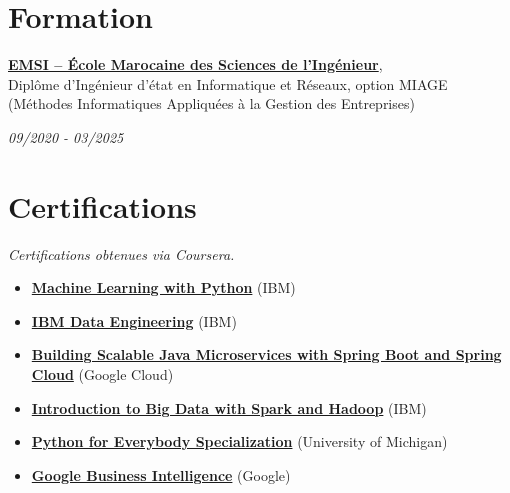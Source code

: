 \documentclass[11pt,a4paper,sans]{moderncv}
\begin{document}
  \vspace{-11pt}
  \section{\fontsize{11}\selectfont Formation}
  \vspace{-4pt}
\noindent
\parbox[t]{0.78\textwidth}{
    \textbf{\href{https://emsi.ma}{EMSI – École Marocaine des Sciences de l’Ingénieur}}, \\
    Diplôme d’Ingénieur d'état en Informatique et Réseaux, option MIAGE 
    (Méthodes Informatiques Appliquées à la Gestion des Entreprises)
}
\hfill
\parbox[t]{0.2\textwidth}{
    \raggedleft \textit{09/2020 - 03/2025}
}
\vspace{0.3em}



{}

  \vspace{-11pt}
  \section{\fontsize{11}\selectfont Certifications}
  \vspace{-5pt}
  \textit{Certifications obtenues via Coursera.}
  \begin{itemize}[leftmargin=0cm, itemsep=-2pt, topsep=0pt, partopsep=0pt, parsep=0pt, label={}]
      \item \textbf{\href{https://www.coursera.org/account/accomplishments/verify/G178XXP17WQA}{Machine Learning with Python}} (IBM)
      \item \textbf{\href{https://www.coursera.org/account/accomplishments/records/M5RKGX36BAVA}{IBM Data Engineering}} (IBM)
      \item \textbf{\href{https://google.com}{Building Scalable Java Microservices with Spring Boot and Spring Cloud}} (Google Cloud)
      \item \textbf{\href{https://www.coursera.org/account/accomplishments/verify/EK5SJM3YM7PX}{Introduction to Big Data with Spark and Hadoop}} (IBM)
      \item \textbf{\href{https://www.coursera.org/account/accomplishments/specialization/B4RCUAYCUG49}{Python for Everybody Specialization}} (University of Michigan)
      \item \textbf{\href{https://www.coursera.org/account/accomplishments/records/G867SJLRFQS2}{Google Business Intelligence}} (Google)
  \end{itemize}
\end{document}
